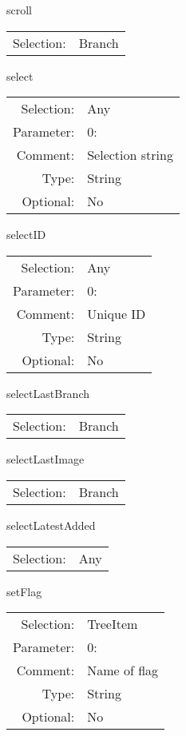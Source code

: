 \item scroll\\
\begin{tabular}{rl}
  Selection: & Branch\\
\end{tabular}

\item select\\
\begin{tabular}{rl}
  Selection: & Any\\
   Parameter: &  0:\\
        Comment: & Selection string\\
           Type: & String\\
       Optional: &  No\\
\end{tabular}

\item selectID\\
\begin{tabular}{rl}
  Selection: & Any\\
   Parameter: &  0:\\
        Comment: & Unique ID\\
           Type: & String\\
       Optional: &  No\\
\end{tabular}

\item selectLastBranch\\
\begin{tabular}{rl}
  Selection: & Branch\\
\end{tabular}

\item selectLastImage\\
\begin{tabular}{rl}
  Selection: & Branch\\
\end{tabular}

\item selectLatestAdded\\
\begin{tabular}{rl}
  Selection: & Any\\
\end{tabular}

\item setFlag\\
\begin{tabular}{rl}
  Selection: & TreeItem\\
   Parameter: &  0:\\
        Comment: & Name of flag\\
           Type: & String\\
       Optional: &  No\\
\end{tabular}

